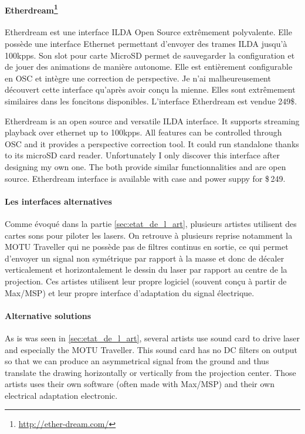 \paragraph*{Etherdream\footnote{\url{http://ether-dream.com/}}}
\begin{fr}
        Etherdream est une interface ILDA Open Source extrêmement polyvalente.
        Elle possède une interface Ethernet permettant d'envoyer des trames ILDA jusqu'à 100\unit{kpps}.
        Son slot pour carte MicroSD permet de sauvegarder la configuration et de jouer des animations de manière autonome.
        Elle est entièrement configurable en OSC et intègre une correction de perspective.
        Je n'ai malheureusement découvert cette interface qu'après avoir conçu la mienne.
        Elles sont extrêmement similaires dans les foncitons disponibles.
        L'interface Etherdream est vendue 249\unit{\$}.
\end{fr}

\begin{en}
        Etherdream is an open source and versatile ILDA interface.
        It supports streaming playback over ethernet up to 100\unit{kpps}.
        All features can be controlled through OSC and it provides a perspective correction tool.
        It could run standalone thanks to its microSD card reader.
        Unfortunately I only discover this interface after designing my own one.
        The both provide similar functionnalities and are open source.
        Etherdream interface is available with case and power suppy for \$\,249.
\end{en}


\begin{fr}
\paragraph*{Les interfaces alternatives} Comme évoqué dans la partie \ref{sec:etat_de_l_art}, plusieurs artistes utilisent des cartes sons pour piloter les lasers. 
On retrouve à plusieurs reprise notamment la MOTU Traveller qui ne possède pas de filtres continus en sortie, ce qui permet d'envoyer un signal non symétrique par rapport à la masse et donc de décaler verticalement et horizontalement le dessin du laser par rapport au centre de la projection.
Ces artistes utilisent leur propre logiciel (souvent conçu à partir de Max/MSP) et leur propre interface d'adaptation du signal électrique.
\end{fr}

\begin{en}
\paragraph*{Alternative solutions} As is was seen in \ref{sec:etat_de_l_art}, several artists use sound card to drive laser and especially the MOTU Traveller.
This sound card has no DC filters on output so that we can produce an asymmetrical signal from the ground and thus translate the drawing horizontally or vertically from the projection center.
Those artists uses their own software (often made with Max/MSP) and their own electrical adaptation electronic.
\end{en}

